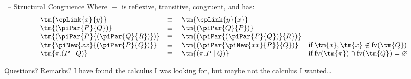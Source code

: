 \documentclass[aspectratio=169,xcolor={dvipsnames,table}]{beamer}
\begin{document}
\begin{frame}{\hccp\ -- Structural Congruence}
  \centering\Large
  Where $\equiv$ is reflexive, transitive, congruent, and has:
  \[
    \begin{array}{llll}
        \tm{\cpLink{x}{y}}
      & \equiv \;
      & \tm{\cpLink{y}{x}}
      \\
        \tm{(\piPar{P}{Q})}
      & \equiv \;
      & \tm{(\piPar{Q}{P})}
      \\
        \tm{( \piPar{P}{( \piPar{Q}{R} )} )}
      & \equiv \;
      & \tm{( \piPar{( \piPar{P}{Q} )}{R} )}
      \\
        \tm{\piNew{x\bar{x}}{( \piPar{P}{Q} )}}
      & \equiv \;
      & \tm{( \piPar{\piNew{x\bar{x}}{P}}{Q} )}
      & \text{if} \; \tm{x},\tm{\bar{x}}\not\in\text{fv}(\tm{Q})
      \\
        \tm{\pi.(P \mid Q)}
      & \equiv \;
      & \tm{(\pi.P \mid Q)}
      & \text{if} \; \text{fv}(\tm{\pi}) \cap \text{fv}(\tm{Q}) = \varnothing
    \end{array}
  \]
\end{frame}

\begin{frame}{Questions? Remarks?}
  \centering\Huge
  I have found the calculus I was looking for,
  but maybe not the calculus I wanted\dots
\end{frame}


\end{document}
